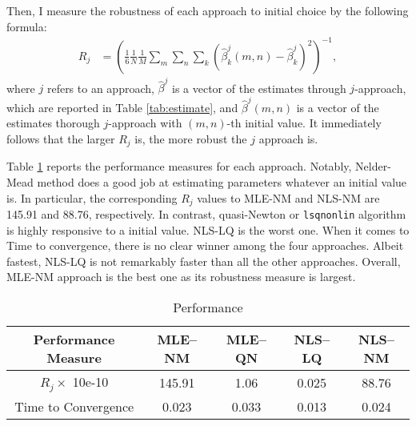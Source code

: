 \documentclass[10pt, letterpaper]{article}
\begin{document}
Then, I measure the robustness of each approach to initial choice by the following formula:
\begin{align}
R_{j} & = (\frac{1}{6} \frac{1}{N} \frac{1}{M} \sum_{m} \sum_{n} \sum_{k} (\hat{\beta}^{j}_{k}(m,n) - \hat{\beta}^{j}_{k})^{2})^{-1}, \nonumber
\end{align}
where 
$j$ refers to an approach, $\hat{\beta}^{j}$ is a vector of the estimates through $j$-approach, which are reported in Table \ref{tab:estimate}, and $\hat{\beta}^{j}(m,n)$ is a vector of the estimates thorough $j$-approach with $(m,n)$-th initial value. It immediately follows that the larger $R_{j}$ is, the more robust the $j$ approach is.  

Table \ref{tab:performance} reports the performance measures for each approach. Notably, Nelder-Mead method does a good job at estimating parameters whatever an initial value is. In particular, the corresponding $R_{j}$ values to MLE-NM and NLS-NM are 145.91 and 88.76, respectively. In contrast, quasi-Newton or {\tt lsqnonlin} algorithm is highly responsive to a initial value. NLS-LQ is the worst one. When it comes to Time to convergence, there is no clear winner among the four approaches. Albeit fastest, NLS-LQ is not remarkably faster than all the other approaches. Overall, MLE-NM approach is the best one as its robustness measure is largest.

\begin{table}[h!]
  \begin{center}
    \caption{Performance}  
    \label{tab:performance}
    \begin{tabular}{c|c|c|c|c} %
      \hline\hline
       Performance Measure     & MLE--NM      &   MLE--QN   &   NLS--LQ   &    NLS--NM       \\
      \hline
       $R_{j} \times$ 10e-10    & 145.91      &    1.06      &    0.025    &    88.76    \\
       Time to Convergence     &  0.023      &    0.033     &    0.013    &    0.024     \\
      \hline      \hline
    \end{tabular}
  \end{center}
\end{table} 



\clearpage
\end{document}
